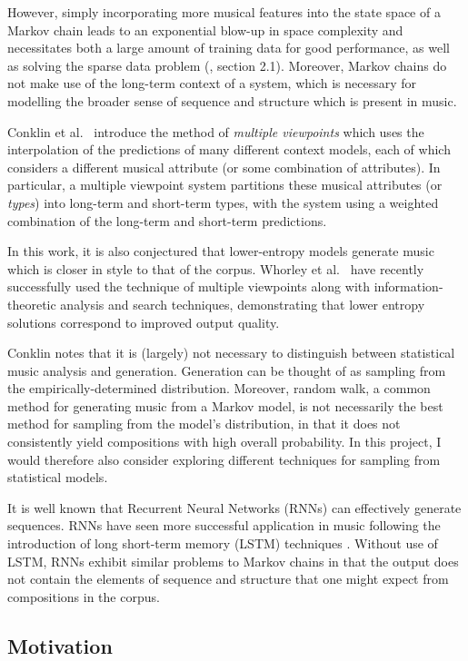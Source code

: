 \documentclass[12pt,a4paper,twoside]{article}
\begin{document}
However, simply incorporating more musical features into the state space of a
Markov chain leads to an exponential blow-up in space complexity and
necessitates both a large amount of training data for good performance, as well
as solving the sparse data problem (\cite{conklin2003music}, section 2.1).
Moreover, Markov chains do not make use of the long-term context of a system,
which is necessary for modelling the broader sense of sequence and structure
which is present in music.

Conklin et al.\ \cite{conklin1995viewpoints} introduce the method of
\emph{multiple viewpoints} which uses the interpolation of the predictions of
many different context models, each of which considers a different musical
attribute (or some combination of attributes). In particular, a multiple
viewpoint system partitions these musical attributes (or \emph{types}) into
long-term and short-term types, with the system using a weighted combination of
the long-term and short-term predictions.

In this work, it is also conjectured that lower-entropy models generate music
which is closer in style to that of the corpus. Whorley et al.\
\cite{whorley2016music} have recently successfully used the technique of
multiple viewpoints along with information-theoretic analysis and search
techniques, demonstrating that lower entropy solutions correspond to improved
output quality.

Conklin \cite{conklin2003music} notes that it is (largely) not necessary to
distinguish between statistical music analysis and generation. Generation can be
thought of as sampling from the empirically-determined distribution. Moreover,
random walk, a common method for generating music from a Markov model, is not
necessarily the best method for sampling from the model's distribution, in that
it does not consistently yield compositions with high overall probability. In
this project, I would therefore also consider exploring different techniques for
sampling from statistical models.

It is well known that Recurrent Neural Networks (RNNs) can effectively generate
sequences. RNNs have seen more successful application in music following the
introduction of long short-term memory (LSTM) techniques \cite{eck2002lstm}.
Without use of LSTM, RNNs exhibit similar problems to Markov chains in that the
output does not contain the elements of sequence and structure that one might
expect from compositions in the corpus.

\subsection*{Motivation}
\end{document}
